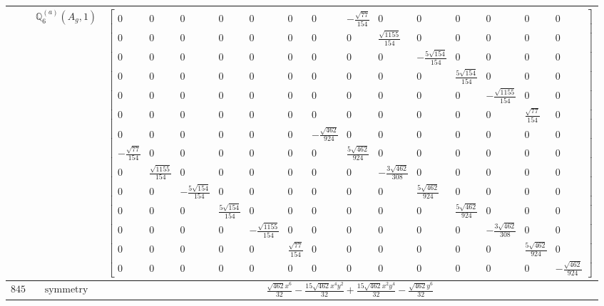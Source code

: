 \documentclass[fleqn,8pt,landscape]{jsarticle}
\begin{document}
\begin{longtable}{ccc}
$  $ & $ \mathbb{Q}_{6}^{(a)}(A_{g},1) $ & $ \begin{bmatrix} 0 & 0 & 0 & 0 & 0 & 0 & 0 & - \frac{\sqrt{77}}{154} & 0 & 0 & 0 & 0 & 0 & 0 \\ 0 & 0 & 0 & 0 & 0 & 0 & 0 & 0 & \frac{\sqrt{1155}}{154} & 0 & 0 & 0 & 0 & 0 \\ 0 & 0 & 0 & 0 & 0 & 0 & 0 & 0 & 0 & - \frac{5 \sqrt{154}}{154} & 0 & 0 & 0 & 0 \\ 0 & 0 & 0 & 0 & 0 & 0 & 0 & 0 & 0 & 0 & \frac{5 \sqrt{154}}{154} & 0 & 0 & 0 \\ 0 & 0 & 0 & 0 & 0 & 0 & 0 & 0 & 0 & 0 & 0 & - \frac{\sqrt{1155}}{154} & 0 & 0 \\ 0 & 0 & 0 & 0 & 0 & 0 & 0 & 0 & 0 & 0 & 0 & 0 & \frac{\sqrt{77}}{154} & 0 \\ 0 & 0 & 0 & 0 & 0 & 0 & - \frac{\sqrt{462}}{924} & 0 & 0 & 0 & 0 & 0 & 0 & 0 \\ - \frac{\sqrt{77}}{154} & 0 & 0 & 0 & 0 & 0 & 0 & \frac{5 \sqrt{462}}{924} & 0 & 0 & 0 & 0 & 0 & 0 \\ 0 & \frac{\sqrt{1155}}{154} & 0 & 0 & 0 & 0 & 0 & 0 & - \frac{3 \sqrt{462}}{308} & 0 & 0 & 0 & 0 & 0 \\ 0 & 0 & - \frac{5 \sqrt{154}}{154} & 0 & 0 & 0 & 0 & 0 & 0 & \frac{5 \sqrt{462}}{924} & 0 & 0 & 0 & 0 \\ 0 & 0 & 0 & \frac{5 \sqrt{154}}{154} & 0 & 0 & 0 & 0 & 0 & 0 & \frac{5 \sqrt{462}}{924} & 0 & 0 & 0 \\ 0 & 0 & 0 & 0 & - \frac{\sqrt{1155}}{154} & 0 & 0 & 0 & 0 & 0 & 0 & - \frac{3 \sqrt{462}}{308} & 0 & 0 \\ 0 & 0 & 0 & 0 & 0 & \frac{\sqrt{77}}{154} & 0 & 0 & 0 & 0 & 0 & 0 & \frac{5 \sqrt{462}}{924} & 0 \\ 0 & 0 & 0 & 0 & 0 & 0 & 0 & 0 & 0 & 0 & 0 & 0 & 0 & - \frac{\sqrt{462}}{924} \end{bmatrix} $ \\ \hline
$ 845 $ & $ \text{symmetry} $ & $ \frac{\sqrt{462} x^{6}}{32} - \frac{15 \sqrt{462} x^{4} y^{2}}{32} + \frac{15 \sqrt{462} x^{2} y^{4}}{32} - \frac{\sqrt{462} y^{6}}{32} $ \\

\end{longtable}
\end{document}
